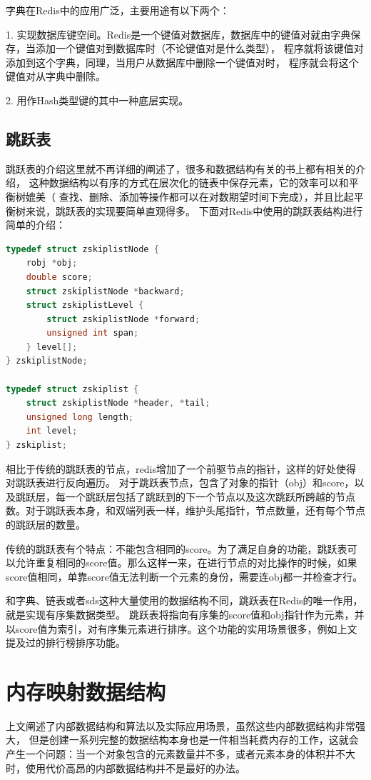 \documentclass{zjutthesis}
\begin{document}
字典在Redis中的应用广泛，主要用途有以下两个：

1. 实现数据库键空间。Redis是一个键值对数据库，数据库中的键值对就由字典保存，当添加一个键值对到数据库时（不论键值对是什么类型）， 程序就将该键值对添加到这个字典，同理，当用户从数据库中删除一个键值对时， 程序就会将这个键值对从字典中删除。

2. 用作Hash类型键的其中一种底层实现。

\subsection{跳跃表}
跳跃表的介绍这里就不再详细的阐述了，很多和数据结构有关的书上都有相关的介绍， 这种数据结构以有序的方式在层次化的链表中保存元素，它的效率可以和平衡树媲美（ 查找、删除、添加等操作都可以在对数期望时间下完成），并且比起平衡树来说，跳跃表的实现要简单直观得多。
下面对Redis中使用的跳跃表结构进行简单的介绍：
\begin{lstlisting}[language=C]
typedef struct zskiplistNode {
    robj *obj;
    double score;
    struct zskiplistNode *backward;
    struct zskiplistLevel {
        struct zskiplistNode *forward;
        unsigned int span;
    } level[];
} zskiplistNode;

typedef struct zskiplist {
    struct zskiplistNode *header, *tail;
    unsigned long length;
    int level;
} zskiplist;
\end{lstlisting}
相比于传统的跳跃表的节点，redis增加了一个前驱节点的指针，这样的好处使得对跳跃表进行反向遍历。
对于跳跃表节点，包含了对象的指针（obj）和score，以及跳跃层，每一个跳跃层包括了跳跃到的下一个节点以及这次跳跃所跨越的节点数。对于跳跃表本身，和双端列表一样，维护头尾指针，节点数量，还有每个节点的跳跃层的数量。

传统的跳跃表有个特点：不能包含相同的score。为了满足自身的功能，跳跃表可以允许重复相同的score值。那么这样一来，在进行节点的对比操作的时候，如果score值相同，单靠score值无法判断一个元素的身份，需要连obj都一并检查才行。

和字典、链表或者sds这种大量使用的数据结构不同，跳跃表在Redis的唯一作用，就是实现有序集数据类型。
跳跃表将指向有序集的score值和obj指针作为元素，并以score值为索引，对有序集元素进行排序。这个功能的实用场景很多，例如上文提及过的排行榜排序功能。


\section{内存映射数据结构}
上文阐述了内部数据结构和算法以及实际应用场景，虽然这些内部数据结构非常强大， 但是创建一系列完整的数据结构本身也是一件相当耗费内存的工作，这就会产生一个问题：当一个对象包含的元素数量并不多，或者元素本身的体积并不大时，使用代价高昂的内部数据结构并不是最好的办法。
\end{document}
